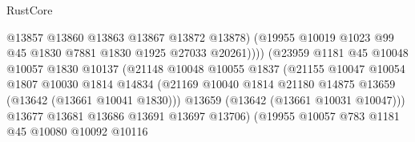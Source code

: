 \begin{lexlean}{RustCore}
\begin{coremodule}
                                        @13857
                                        @13860
                                        @13863
                                        @13867
                                        @13872
                                        @13878)
                                      (@19955
                                        @10019
                                        @1023
                                        @99
                                        @45
                                        @1830
                                        @7881
                                        @1830
                                        @1925
                                        @27033
                                        @20261))))
                                (@23959
                                  @1181
                                  @45
                                  @10048
                                  @10057
                                  @1830
                                  @10137
                                  (@21148
                                    @10048
                                    @10055
                                    @1837
                                    (@21155
                                      @10047
                                      @10054
                                      @1807
                                      @10030
                                      @1814
                                      @14834
                                      (@21169
                                        @10040
                                        @1814
                                        @21180
                                        @14875
                                        @13659
                                        (@13642 (@13661 @10041 @1830)))
                                      @13659
                                      (@13642 (@13661 @10031 @10047)))
                                    @13677
                                    @13681
                                    @13686
                                    @13691
                                    @13697
                                    @13706)
                                  (@19955
                                    @10057
                                    @783
                                    @1181
                                    @45
                                    @10080
                                    @10092
                                    @10116

\end{coremodule}
\end{lexlean}

